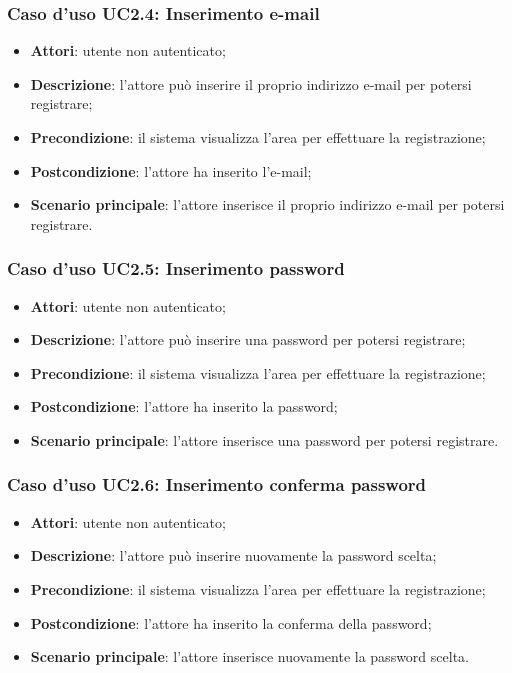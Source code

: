 \subsubsection{Caso d'uso UC2.4: Inserimento e-mail}
\begin{itemize}
\item \textbf{Attori}: utente non autenticato;
\item \textbf{Descrizione}: l'attore può inserire il proprio indirizzo e-mail per potersi registrare;
\item \textbf{Precondizione}: il sistema visualizza l'area per effettuare la registrazione;
\item \textbf{Postcondizione}: l'attore ha inserito l'e-mail;
\item \textbf{Scenario principale}: l'attore inserisce il proprio indirizzo e-mail per potersi registrare.
\end{itemize}

\subsubsection{Caso d'uso UC2.5: Inserimento password}
\begin{itemize}
\item \textbf{Attori}: utente non autenticato;
\item \textbf{Descrizione}: l'attore può inserire una password per potersi registrare;
\item \textbf{Precondizione}: il sistema visualizza l'area per effettuare la registrazione;
\item \textbf{Postcondizione}: l'attore ha inserito la password;
\item \textbf{Scenario principale}: l'attore inserisce una password per potersi registrare.
\end{itemize}

\subsubsection{Caso d'uso UC2.6: Inserimento conferma password}
\begin{itemize}
\item \textbf{Attori}: utente non autenticato;
\item \textbf{Descrizione}: l'attore può inserire nuovamente la password scelta;
\item \textbf{Precondizione}: il sistema visualizza l'area per effettuare la registrazione;
\item \textbf{Postcondizione}: l'attore ha inserito la conferma della password;
\item \textbf{Scenario principale}: l'attore inserisce nuovamente la password scelta.
\end{itemize}

